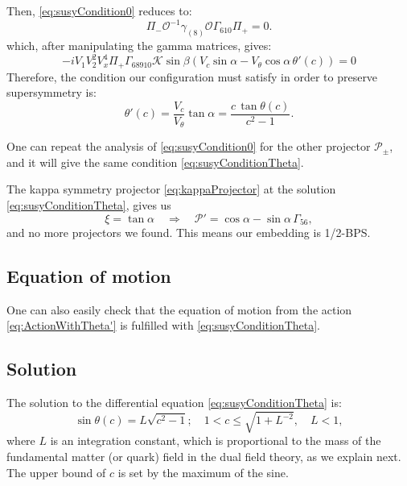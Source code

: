 Then, \eqref{eq:susyCondition0} reduces to:
\begin{equation}
 \Pi_{-} \mathcal{O}^{-1} \gamma_{(8)} \mathcal{O} \Gamma_{610} \Pi_{+}  = 0.
\end{equation}
which, after manipulating the gamma matrices, gives:
\begin{equation}
-i V_1 V_2^2 V_x^4 \Pi_+ \Gamma_{6 8 9 10} \mathcal{K} \sin\beta \left(V_c \sin\alpha - V_\theta \cos\alpha \, \theta'(c)\right) = 0
\end{equation}
Therefore, the condition our configuration must satisfy in order to preserve supersymmetry is:
\begin{equation}\label{eq:susyConditionTheta}
 \theta'(c) = \dfrac{V_c}{V_\theta} \tan\alpha = \dfrac{c \, \tan\theta(c)}{c^2-1} .
\end{equation}


One can repeat the analysis of \eqref{eq:susyCondition0} for the other projector $\mathcal{P}_{\pm}$, and it will give the same condition \eqref{eq:susyConditionTheta}.


The kappa symmetry projector \eqref{eq:kappaProjector} at the solution \eqref{eq:susyConditionTheta}, gives us
\begin{equation}
 \xi =  \tan \alpha \quad \Rightarrow \quad \mathcal{P}' = \cos \alpha - \sin \alpha \, \Gamma_{56},
\end{equation}
and no more projectors we found. This means our embedding is 1/2-BPS.


\subsection{Equation of motion}

One can also easily check that the equation of motion from the action \eqref{eq:ActionWithTheta'} is fulfilled with \eqref{eq:susyConditionTheta}.



\subsection{Solution}

The solution to the differential equation \eqref{eq:susyConditionTheta} is:
\begin{equation}\label{eq:susyConditionSolution}
\boxed{\sin\theta(c) = L \sqrt{c^2-1}; \quad 1 < c \leq \sqrt{1+L^{-2}}, \quad L < 1},
\end{equation}
where $L$ is an integration constant, which is proportional to the mass of the fundamental matter (or quark) field in the dual field theory, as we explain next. The upper bound of $c$ is set by the maximum of the sine.

